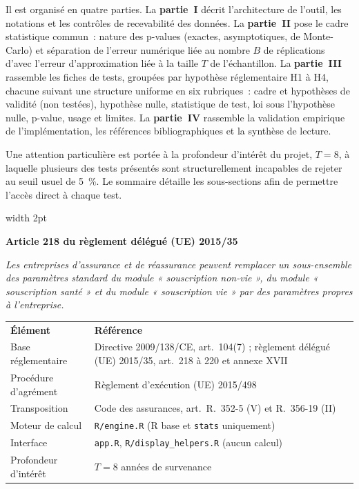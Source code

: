 \documentclass[a4paper,11pt]{article}
\newcommand{\code}[1]{\texttt{\small #1}}
\newcommand{\reglement}[2]{%
  \par\vspace{2mm}\noindent\begin{minipage}{\linewidth}
  \small\setlength{\parindent}{0pt}
  \textcolor{financeblue}{\vrule width 2pt}\hspace{4mm}%
  \begin{minipage}{\dimexpr\linewidth-7mm\relax}
  \textcolor{financeblue}{\textbf{#1}}
  \par\vspace{2pt}
  {\itshape #2}
  \end{minipage}
  \end{minipage}\par\vspace{3mm}}
\begin{document}
\medskip\noindent
Il est organisé en quatre parties. La \textbf{partie~I} décrit l'architecture de
l'outil, les notations et les contrôles de recevabilité des données. La
\textbf{partie~II} pose le cadre statistique commun~: nature des p-values
(exactes, asymptotiques, de Monte-Carlo) et séparation de l'erreur numérique
liée au nombre $B$ de réplications d'avec l'erreur d'approximation liée à la
taille $T$ de l'échantillon. La \textbf{partie~III} rassemble les fiches de
tests, groupées par hypothèse réglementaire H1 à H4, chacune suivant une
structure uniforme en six rubriques~: cadre et hypothèses de validité (non
testées), hypothèse nulle, statistique de test, loi sous l'hypothèse nulle,
p-value, usage et limites. La \textbf{partie~IV} rassemble la validation
empirique de l'implémentation, les références bibliographiques et la synthèse
de lecture.

\medskip\noindent
Une attention particulière est portée à la profondeur d'intérêt du projet,
$T = 8$, à laquelle plusieurs des tests présentés sont structurellement
incapables de rejeter au seuil usuel de 5~\%. Le sommaire détaille les
sous-sections afin de permettre l'accès direct à chaque test.

\vspace{8mm}
\reglement{Article 218 du règlement délégué (UE) 2015/35}{Les entreprises
d'assurance et de réassurance peuvent remplacer un sous-ensemble des paramètres
standard du module « souscription non-vie », du module « souscription santé » et
du module « souscription vie » par des paramètres propres à l'entreprise.}

\vspace{6mm}
\noindent
\begin{center}
\small
{}
\begin{tabular}{@{}p{5.2cm}p{9.6cm}@{}}
\rowcolor{tableheader}
\textcolor{financeblue}{\textbf{Élément}} & \textcolor{financeblue}{\textbf{Référence}} \\
Base réglementaire & Directive 2009/138/CE, art.~104(7) ; règlement délégué
(UE) 2015/35, art.~218 à 220 et annexe XVII \\
Procédure d'agrément & Règlement d'exécution (UE) 2015/498 \\
Transposition & Code des assurances, art.~R.~352-5 (V) et R.~356-19 (II) \\
Moteur de calcul & \code{R/engine.R} (R base et \code{stats} uniquement) \\
Interface & \code{app.R}, \code{R/display\_helpers.R} (aucun calcul) \\
Profondeur d'intérêt & $T = 8$ années de survenance \\
\end{tabular}
\end{center}
\end{document}
